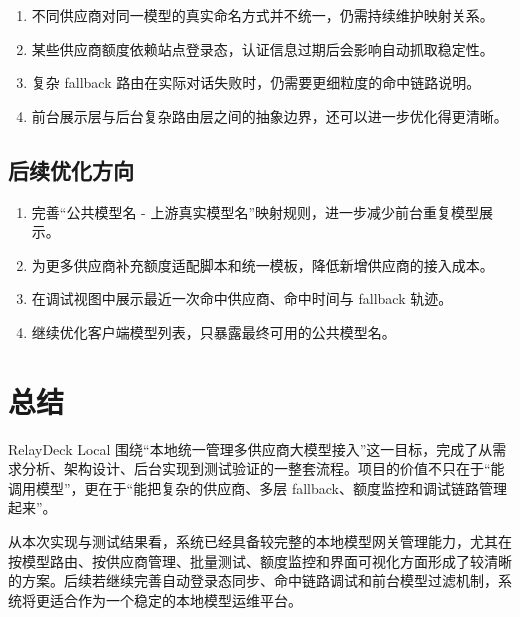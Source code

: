 \documentclass[12pt,a4paper]{ctexart}
\begin{document}
\begin{enumerate}[label=\arabic*.]
  \item 不同供应商对同一模型的真实命名方式并不统一，仍需持续维护映射关系。
  \item 某些供应商额度依赖站点登录态，认证信息过期后会影响自动抓取稳定性。
  \item 复杂 fallback 路由在实际对话失败时，仍需要更细粒度的命中链路说明。
  \item 前台展示层与后台复杂路由层之间的抽象边界，还可以进一步优化得更清晰。
\end{enumerate}

\subsection{后续优化方向}

\begin{enumerate}[label=\arabic*.]
  \item 完善“公共模型名 - 上游真实模型名”映射规则，进一步减少前台重复模型展示。
  \item 为更多供应商补充额度适配脚本和统一模板，降低新增供应商的接入成本。
  \item 在调试视图中展示最近一次命中供应商、命中时间与 fallback 轨迹。
  \item 继续优化客户端模型列表，只暴露最终可用的公共模型名。
\end{enumerate}

\section{总结}

RelayDeck Local 围绕“本地统一管理多供应商大模型接入”这一目标，完成了从需求分析、架构设计、后台实现到测试验证的一整套流程。项目的价值不只在于“能调用模型”，更在于“能把复杂的供应商、多层 fallback、额度监控和调试链路管理起来”。

从本次实现与测试结果看，系统已经具备较完整的本地模型网关管理能力，尤其在按模型路由、按供应商管理、批量测试、额度监控和界面可视化方面形成了较清晰的方案。后续若继续完善自动登录态同步、命中链路调试和前台模型过滤机制，系统将更适合作为一个稳定的本地模型运维平台。
\end{document}
